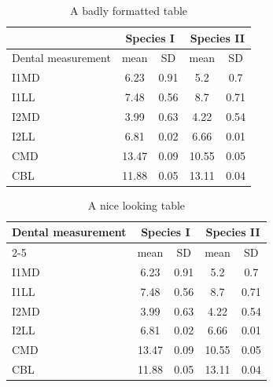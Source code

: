 \begin{table}
\caption{A badly formatted table}
\centering
\label{table:bad_table}
\begin{tabular}{|l|c|c|c|c|}
\hline 
& \multicolumn{2}{c}{Species I} & \multicolumn{2}{c|}{Species II} \\ 
\hline
Dental measurement  & mean & SD  & mean & SD  \\ \hline 
\hline
I1MD & 6.23 & 0.91 & 5.2  & 0.7  \\
\hline 
I1LL & 7.48 & 0.56 & 8.7  & 0.71 \\
\hline 
I2MD & 3.99 & 0.63 & 4.22 & 0.54 \\
\hline 
I2LL & 6.81 & 0.02 & 6.66 & 0.01 \\
\hline 
CMD & 13.47 & 0.09 & 10.55 & 0.05 \\
\hline 
CBL & 11.88 & 0.05 & 13.11 & 0.04\\ 
\hline 
\end{tabular}
\end{table}

\begin{table}
\caption{A nice looking table}
\centering
\label{table:nice_table}
\begin{tabular}{l c c c c}
\hline 
\multirow{2}{*}{Dental measurement} & \multicolumn{2}{c}{Species I} & \multicolumn{2}{c}{Species II} \\ 
\cline{2-5}
  & mean & SD  & mean & SD  \\ 
\hline
I1MD & 6.23 & 0.91 & 5.2  & 0.7  \\

I1LL & 7.48 & 0.56 & 8.7  & 0.71 \\

I2MD & 3.99 & 0.63 & 4.22 & 0.54 \\

I2LL & 6.81 & 0.02 & 6.66 & 0.01 \\

CMD & 13.47 & 0.09 & 10.55 & 0.05 \\

CBL & 11.88 & 0.05 & 13.11 & 0.04\\ 
\hline 
\end{tabular}
\end{table}


